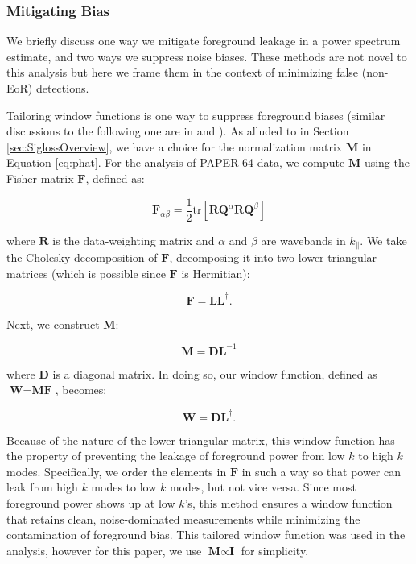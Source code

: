 \documentclass[preprint2,numberedappendix,tighten]{aastex6}  %
\begin{document}
\subsubsection{Mitigating Bias}

We briefly discuss one way we mitigate foreground leakage in a power spectrum estimate, and two ways we 
suppress noise biases. These methods are not novel to this analysis but here we frame them in the context of minimizing false 
(non-EoR) detections. 

Tailoring window functions is one way to suppress foreground biases (similar discussions to the following one are in \citet{liu_et_al2014b} and ). As alluded to in Section \ref{sec:SiglossOverview}, we 
have a choice for the normalization matrix $\textbf{M}$ in Equation \eqref{eq:phat}. For the analysis of PAPER-64 data, we 
compute $\textbf{M}$ using the Fisher matrix $\textbf{F}$, defined as:

\begin{equation}
\textbf{F}_{\alpha\beta} = \frac{1}{2} \text{tr} [\textbf{R}\textbf{Q}^{\alpha}\textbf{R}\textbf{Q}^{\beta} ]
\end{equation}

\noindent where $\textbf{R}$ is the data-weighting matrix and $\alpha$ and $\beta$ are wavebands in $k_{\parallel}$. We take 
the Cholesky decomposition of $\textbf{F}$, decomposing it into two lower triangular matrices (which is possible since $\textbf{F}$ is Hermitian):

\begin{equation}
\textbf{F} = \textbf{LL}^{\dagger}.
\end{equation}

\noindent Next, we construct $\textbf{M}$:

\begin{equation}
\textbf{M} = \textbf{DL}^{-1}
\end{equation}

\noindent where $\textbf{D}$ is a diagonal matrix. In doing so, our window function, defined as $\textbf{W} = \textbf{MF}$, 
becomes:

\begin{equation}
\textbf{W} = \textbf{DL}^{\dagger}.
\end{equation}

\noindent Because of the nature of the lower triangular matrix, this window function has the property of preventing the leakage 
of foreground power from low $k$ to high $k$ modes. Specifically, we order the elements in $\textbf{F}$ in such a way so that 
power can leak from high $k$ modes to low $k$ modes, but not vice versa. Since most foreground power shows up at low 
$k$'s, this method ensures a window function that retains clean, noise-dominated measurements while minimizing the 
contamination of foreground bias. This tailored window function was used in the  analysis, however for this paper, we use $\textbf{M} \propto \textbf{I}$ for simplicity.
\end{document}
